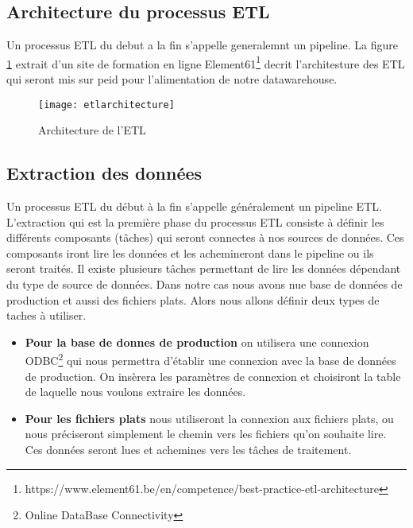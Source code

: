 \subsection{Architecture du processus ETL}
Un processus ETL du debut a la fin s'appelle generalemnt  un pipeline. La figure \ref{fig:etlarchitecture} extrait d'un site de formation en ligne Element61\footnote{https://www.element61.be/en/competence/best-practice-etl-architecture} decrit l'architesture des ETL qui seront mis sur peid pour l'alimentation de notre datawarehouse.

\begin{figure}[H]
    \centering
    \texttt{[image: etlarchitecture]}
    \caption{Architecture de l'ETL}
    \label{fig:etlarchitecture}
\end{figure}



\subsection{Extraction des données}
Un processus ETL du début à la fin s'appelle généralement un pipeline ETL. L’extraction qui est la première phase du processus ETL consiste à définir les différents composants (tâches) qui seront connectes à nos sources de données. Ces composants iront lire les données et les achemineront dans le pipeline ou ils seront traités. Il existe plusieurs tâches permettant de lire les données dépendant du type de source de données. Dans notre cas nous avons nue base de données de production et aussi des fichiers plats. Alors nous allons définir deux types de taches à utiliser.
\begin{itemize}
    \item \textbf{Pour la base de donnes de production} on utilisera une connexion ODBC\footnote{Online DataBase Connectivity} qui nous permettra d’établir une connexion avec la base de données de production. On insèrera les paramètres de connexion et choisiront la table de laquelle nous voulons extraire les données. 
    \item \textbf{Pour les fichiers plats} nous utiliseront la connexion aux fichiers plats, ou nous préciseront simplement le chemin vers les fichiers qu’on souhaite lire. Ces données seront lues et achemines vers les tâches de traitement.
\end{itemize}

